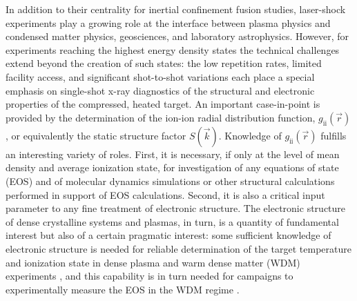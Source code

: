 In addition to their centrality for inertial confinement fusion
studies, \cite{lindl2004physics,moses2009ignition}
laser-shock experiments play a growing role at the interface between
plasma physics and condensed matter physics, geosciences, and laboratory
astrophysics. \cite{langenhorst1999laser, gattacceca2010unraveling, takabe2008high, silva2004proton, remington2000review, park2012studying, koenig2006radiative, macchi2013ion, gregori2012generation, fiuza2012weibel, dollar2013scaling, akli2008laser}
However, for experiments reaching the highest energy density states the
technical challenges extend beyond the creation of such states: the low
repetition rates, limited facility access, and significant shot-to-shot
variations each place a special emphasis on single-shot x-ray
diagnostics of the structural and electronic properties of the
compressed, heated
target. \cite{young1998high, oades2004target, workman2001x, stoeckl2001hard, landen2001x, hudson2002high, dewald2004dante}
An important case-in-point is provided by the determination of the
ion-ion radial distribution function,
\(g_{\text{ii}}\left( \overrightarrow{r} \right)\), or equivalently the
static structure factor \(S(\overrightarrow{k})\). Knowledge of
\(g_{\text{ii}}\left( \overrightarrow{r} \right)\) fulfills an
interesting variety of roles. First, it is necessary, if only at the
level of mean density and average ionization state, for investigation of
any equations of state (EOS) and of molecular dynamics simulations or
other structural calculations performed in support of EOS calculations.
Second, it is also a critical input parameter to any fine treatment of
electronic structure. The electronic structure of dense crystalline
systems and plasmas, in turn, is a quantity of fundamental interest but
also of a certain pragmatic interest: some sufficient knowledge of
electronic structure is needed for reliable determination of the target
temperature and ionization state in dense plasma and warm dense matter
(WDM) experiments
 \cite{glenzer2009x, gregori2004electronic}{},
and this capability is in turn needed for campaigns to experimentally
measure the EOS in the WDM regime
 \cite{lee2009x, fortmann2012measurement, mattern2013condensed}.

